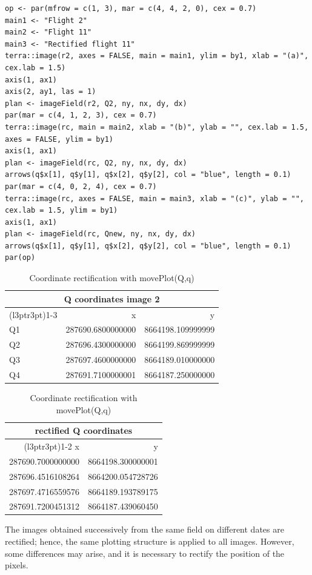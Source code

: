 \begin{verbatim}
op <- par(mfrow = c(1, 3), mar = c(4, 4, 2, 0), cex = 0.7)
main1 <- "Flight 2"
main2 <- "Flight 11"
main3 <- "Rectified flight 11"
terra::image(r2, axes = FALSE, main = main1, ylim = by1, xlab = "(a)", cex.lab = 1.5)
axis(1, ax1)
axis(2, ay1, las = 1)
plan <- imageField(r2, Q2, ny, nx, dy, dx)
par(mar = c(4, 1, 2, 3), cex = 0.7)
terra::image(rc, main = main2, xlab = "(b)", ylab = "", cex.lab = 1.5, axes = FALSE, ylim = by1)
axis(1, ax1)
plan <- imageField(rc, Q2, ny, nx, dy, dx)
arrows(q$x[1], q$y[1], q$x[2], q$y[2], col = "blue", length = 0.1)
par(mar = c(4, 0, 2, 4), cex = 0.7)
terra::image(rc, axes = FALSE, main = main3, xlab = "(c)", ylab = "", cex.lab = 1.5, ylim = by1)
axis(1, ax1)
plan <- imageField(rc, Qnew, ny, nx, dy, dx)
arrows(q$x[1], q$y[1], q$x[2], q$y[2], col = "blue", length = 0.1)
par(op)
\end{verbatim}

\begin{table}
\caption{\label{tab:EU4}Coordinate rectification with movePlot(Q,q)}

\begin{tabular}{lrr}
\toprule
\multicolumn{3}{c}{Q coordinates image 2} \\
\cmidrule(l{3pt}r{3pt}){1-3}
  & x & y\\
\midrule
Q1 & 287690.6800000000 & 8664198.109999999\\
Q2 & 287696.4300000000 & 8664199.869999999\\
Q3 & 287697.4600000000 & 8664189.010000000\\
Q4 & 287691.7100000001 & 8664187.250000000\\
\bottomrule
\end{tabular}
\begin{tabular}{rr}
\toprule
\multicolumn{2}{c}{rectified Q coordinates} \\
\cmidrule(l{3pt}r{3pt}){1-2}
x & y\\
\midrule
287690.7000000000 & 8664198.300000001\\
287696.4516108264 & 8664200.054728726\\
287697.4716559576 & 8664189.193789175\\
287691.7200451312 & 8664187.439060450\\
\bottomrule
\end{tabular}
\end{table}

The images obtained successively from the same field on different dates are rectified; hence, the same plotting structure is applied to all images. However, some differences may arise, and it is necessary to rectify the position of the pixels.

